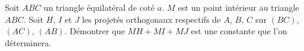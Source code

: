
Soit $ABC$ un triangle équilatéral de coté $a$. $M$ est un point intérieur au triangle $ABC$. Soit $H$, $I$ et $J$ les projetés orthogonaux respectifs de $A$, $B$, $C$ sur $(BC)$, $(AC)$, $(AB)$. Démontrer que $ MH + MI + MJ$ est  une constante que l'on déterminera.
